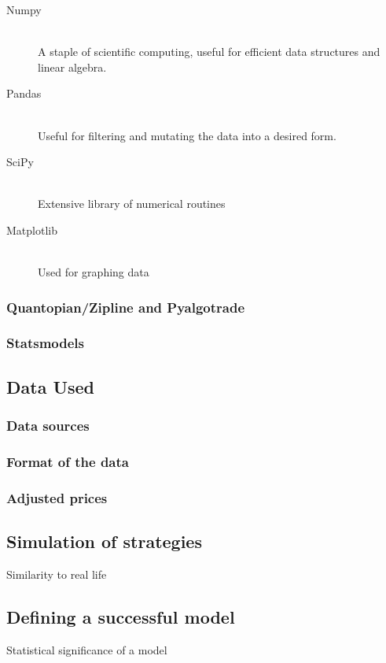 \documentclass{report}
\begin{document}
\begin{description}

  \item[Numpy] \hfill \\ A staple of scientific computing, useful for efficient data structures and linear algebra.
   
  \item[Pandas] \hfill \\ Useful for filtering and mutating the data into a desired form.  
  
  \item[SciPy] \hfill \\ Extensive library of numerical routines
  
  \item[Matplotlib] \hfill \\ Used for graphing data

\end{description}  
 
  
\subsubsection{Quantopian/Zipline and Pyalgotrade}
\subsubsection{Statsmodels}

\subsection{Data Used}
\subsubsection{Data sources}
\subsubsection{Format of the data}
\subsubsection{Adjusted prices}

\subsection{Simulation of strategies}
Similarity to real life

\subsection{Defining a successful model}
Statistical significance of a model
\end{document}
